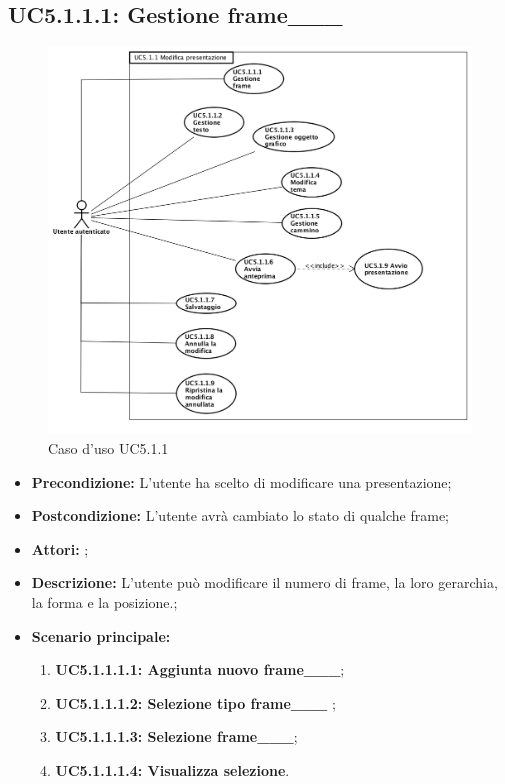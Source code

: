 \subsection{ UC5.1.1.1: Gestione frame___}

\begin{figure}[h]
	\begin{center}
	\includegraphics[scale=0.4]{diagram/UC5-1-1.png}
	\caption{Caso d'uso UC5.1.1}
	\end{center}
\end{figure}
\begin{itemize}
	\item \textbf{Precondizione:} L'utente ha scelto di modificare una presentazione;
	\item \textbf{Postcondizione:} L'utente avrà cambiato lo stato di qualche frame;
	\item \textbf{Attori:} ;
	\item \textbf{Descrizione:} L'utente può modificare il numero di frame, la loro gerarchia, la forma e la posizione.;
	\item \textbf{Scenario principale:}
	\begin{enumerate}
		\item \textbf{ UC5.1.1.1.1: Aggiunta nuovo frame___};
		\item \textbf{ UC5.1.1.1.2: Selezione tipo frame___ };
		\item \textbf{ UC5.1.1.1.3: Selezione frame___};
		\item \textbf{ UC5.1.1.1.4: Visualizza selezione}.
	\end{enumerate}
\end{itemize}
